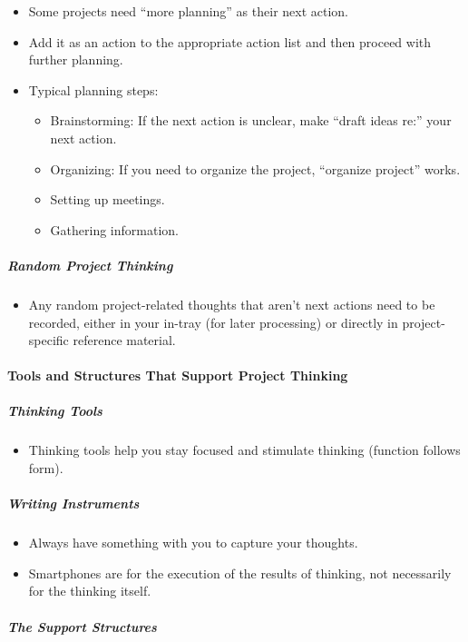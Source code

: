 \documentclass{article}
\begin{document}
\begin{itemize}
 \item Some projects need ``more planning'' as their next action.
 \item Add it as an action to the appropriate action list and then proceed with further planning.
 \item Typical planning steps:
 \begin{itemize}
  \item Brainstorming: If the next action is unclear, make ``draft ideas re:'' your next action.
  \item Organizing: If you need to organize the project, ``organize project'' works.
  \item Setting up meetings.
  \item Gathering information.
 \end{itemize}
\end{itemize}

\subparagraph{Random Project Thinking}

\begin{itemize}
 \item Any random project-related thoughts that aren't next actions need to be recorded, either in your in-tray (for later processing) or directly in project-specific reference material.
\end{itemize}

\paragraph{Tools and Structures That Support Project Thinking}

\subparagraph{Thinking Tools}

\begin{itemize}
 \item Thinking tools help you stay focused and stimulate thinking (function follows form).
\end{itemize}

\subparagraph{Writing Instruments}

\begin{itemize}
 \item Always have something with you to capture your thoughts.
 \item Smartphones are for the execution of the results of thinking, not necessarily for the thinking itself.
\end{itemize}

\subparagraph{The Support Structures}
\end{document}
